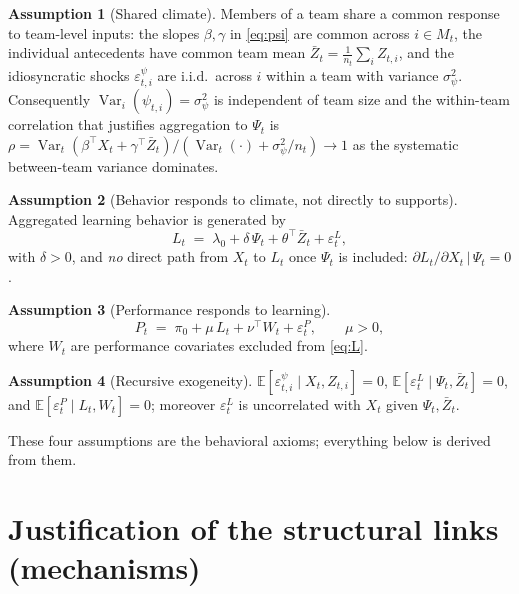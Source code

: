 \documentclass{amsart}
\theoremstyle{definition}
\newtheorem{assumption}{Assumption}
\theoremstyle{remark}
\begin{document}
\begin{assumption}[Shared climate]\label{ass:share}
Members of a team share a common response to team-level inputs: the slopes
$\beta,\gamma$ in \eqref{eq:psi} are common across $i\in M_t$, the
individual antecedents have common team mean
$\bar Z_t=\frac1{n_t}\sum_i Z_{t,i}$, and the idiosyncratic shocks
$\varepsilon^{\psi}_{t,i}$ are i.i.d.\ across $i$ within a team with
variance $\sigma^2_\psi$. Consequently
$\operatorname{Var}_{i}(\psi_{t,i})=\sigma^2_\psi$ is independent of team
size and the within-team correlation that justifies aggregation to
$\Psi_t$ is $\rho=\operatorname{Var}_t(\beta^\top X_t+\gamma^\top\bar Z_t)
/(\operatorname{Var}_t(\cdot)+\sigma^2_\psi/n_t)\to 1$ as the systematic
between-team variance dominates.
\end{assumption}

\begin{assumption}[Behavior responds to climate, not directly to supports]%
\label{ass:behavior}
Aggregated learning behavior is generated by
\begin{equation}\label{eq:L}
L_t \;=\; \lambda_0 + \delta\,\Psi_t + \theta^{\top}\bar Z_t
          + \varepsilon^{L}_t,
\end{equation}
with $\delta>0$, and \emph{no} direct path from $X_t$ to $L_t$ once
$\Psi_t$ is included: $\partial L_t/\partial X_t \,|\, \Psi_t = 0$.
\end{assumption}

\begin{assumption}[Performance responds to learning]\label{ass:perf}
\begin{equation}\label{eq:P}
P_t \;=\; \pi_0 + \mu\, L_t + \nu^{\top} W_t + \varepsilon^{P}_t,
\qquad \mu>0,
\end{equation}
where $W_t$ are performance covariates excluded from \eqref{eq:L}.
\end{assumption}

\begin{assumption}[Recursive exogeneity]\label{ass:exog}
$\mathbb{E}[\varepsilon^{\psi}_{t,i}\mid X_t,Z_{t,i}]=0$,
$\mathbb{E}[\varepsilon^{L}_t\mid \Psi_t,\bar Z_t]=0$, and
$\mathbb{E}[\varepsilon^{P}_t\mid L_t,W_t]=0$; moreover
$\varepsilon^L_t$ is uncorrelated with $X_t$ given $\Psi_t,\bar Z_t$.
\end{assumption}

These four assumptions are the behavioral axioms; everything below is
derived from them.

\section{Justification of the structural links (mechanisms)}
\end{document}
